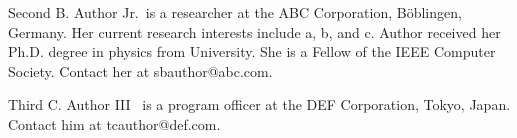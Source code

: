 \documentclass{IEEEcsmag}
\begin{document}
\begin{IEEEbiography}{Second B. Author Jr.}{\,} is a researcher at the  ABC Corporation, B\"oblingen, Germany.  Her current research interests include a, b, and c. Author received her Ph.D. degree  in physics from University. She is a Fellow of the IEEE Computer Society. Contact her at sbauthor@abc.com.\vspace*{8pt}
\end{IEEEbiography}

\begin{IEEEbiography}{Third C. Author III} {\,} is a program officer at the  DEF Corporation, Tokyo, Japan. Contact him at tcauthor@def.com.
\end{IEEEbiography}
\end{document}
